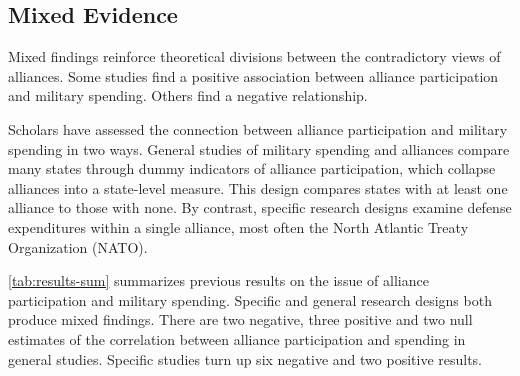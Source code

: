 \documentclass[12pt]{article}
\begin{document}
\subsection{Mixed Evidence} 


Mixed findings reinforce theoretical divisions between the contradictory views of alliances.
Some studies find a positive association between alliance participation and military spending. 
Others find a negative relationship.


Scholars have assessed the connection between alliance participation and military spending in two ways. 
General studies of military spending and alliances compare many states through dummy indicators of alliance participation, which collapse alliances into a state-level measure. 
This design compares states with at least one alliance to those with none.
By contrast, specific research designs examine defense expenditures within a single alliance, most often the North Atlantic Treaty Organization (NATO).


\autoref{tab:results-sum} summarizes previous results on the issue of alliance participation and military spending. 
Specific and general research designs both produce mixed findings. 
There are two negative, three positive and two null estimates of the correlation between alliance participation and spending in general studies. 
Specific studies turn up six negative and two positive results.  
\end{document}
